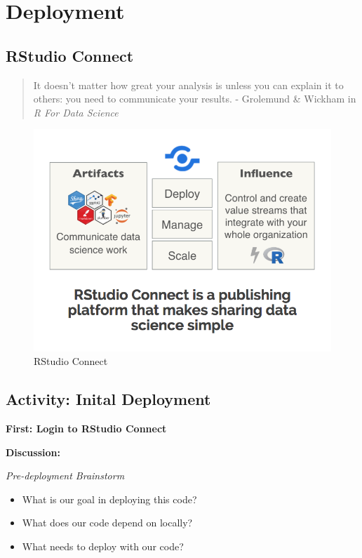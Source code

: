 \documentclass[]{book}
\providecommand{\tightlist}{%
  \setlength{\itemsep}{0pt}\setlength{\parskip}{0pt}}
\theoremstyle{definition}
\theoremstyle{definition}
\theoremstyle{definition}
\theoremstyle{remark}
\begin{document}
\hypertarget{deployment}{%
\chapter{Deployment}\label{deployment}}

\hypertarget{rstudio-connect}{%
\section{RStudio Connect}\label{rstudio-connect}}

\begin{quote}
It doesn't matter how great your analysis is unless you can explain it
to others: you need to communicate your results. - Grolemund \& Wickham
in \emph{R For Data Science}
\end{quote}

\begin{figure}
\centering
\includegraphics{imgs/deployment/rstudio-connect.png}
\caption{RStudio Connect}
\end{figure}

\hypertarget{activity-inital-deployment}{%
\section{Activity: Inital Deployment}\label{activity-inital-deployment}}

\textbf{First: Login to RStudio Connect}

\textbf{Discussion:}

\emph{Pre-deployment Brainstorm}

\begin{itemize}
\tightlist
\item
  What is our goal in deploying this code?
\item
  What does our code depend on locally?
\item
  What needs to deploy with our code?
\end{itemize}
\end{document}
